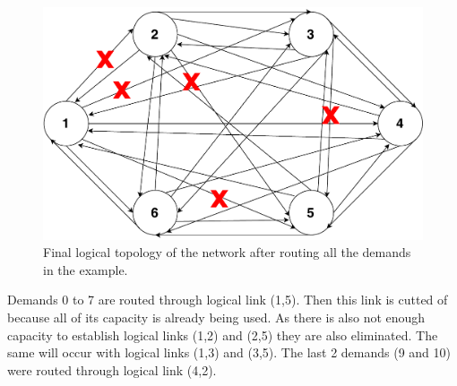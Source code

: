 \begin{figure}[H]
	\centering
	\includegraphics[width=15cm]{sdf/heuristic/transparent/figures/logicalTopologyAfter}
	\caption{Final logical topology of the network after routing all the demands in the example.}
	\label{routing_result}
\end{figure}

Demands 0 to 7 are routed through logical link (1,5). Then this link is cutted of because all of its capacity is already being used. As there is also not enough capacity to establish logical links (1,2) and (2,5) they are also eliminated. The same will occur with logical links (1,3) and (3,5). The last 2 demands (9 and 10) were routed through logical link (4,2). 

